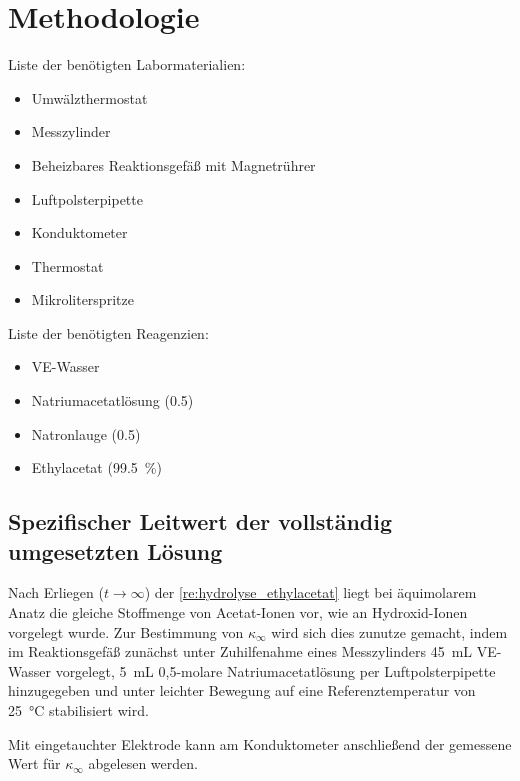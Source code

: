 \chapter{Methodologie}
	Liste der benötigten Labormaterialien:
	\begin{itemize}
		\item Umwälzthermostat
		\item Messzylinder
		\item Beheizbares Reaktionsgefäß mit Magnetrührer
		\item Luftpolsterpipette
		\item Konduktometer
		\item Thermostat
		\item Mikroliterspritze
	\end{itemize}
	Liste der benötigten Reagenzien:
	\begin{itemize}
		\item VE-Wasser
		\item Natriumacetatlösung (\SI{0,5}{})
		\item Natronlauge (\SI{0,5}{\frac{\mole}{}})
		\item Ethylacetat (\SI{99,5}{\percent})
	\end{itemize}\par\medskip
	\section{Spezifischer Leitwert der vollständig umgesetzten Lösung}\label{sec:kappa infty}
		Nach Erliegen (\(t \rightarrow \infty\)) der \cref{re:hydrolyse_ethylacetat} liegt bei äquimolarem Anatz die gleiche Stoffmenge
		von Acetat-Ionen vor, wie an Hydroxid-Ionen vorgelegt wurde. Zur Bestimmung von \(\kappa_{\infty}\) wird sich dies zunutze gemacht,
		indem im Reaktionsgefäß zunächst unter Zuhilfenahme eines Messzylinders \SI{45}{mL} VE-Wasser vorgelegt, \SI{5}{mL} 0,5-molare Natriumacetatlösung per Luftpolsterpipette
		hinzugegeben und unter leichter Bewegung auf eine Referenztemperatur von \SI{25}{\celsius} stabilisiert wird.\par
		Mit eingetauchter Elektrode kann am Konduktometer anschließend der gemessene Wert für \(\kappa_{\infty}\) abgelesen werden.\par\medskip
